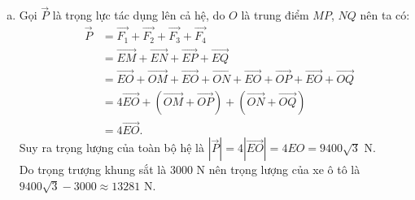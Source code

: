 \begin{ex}
{\begin{enumerate}[a)]
	 Xét $\triangle EMO$ có $EM=4700$, $\widehat{SMO}=60^\circ$. Suy ra $EO = EM \sin 60^\circ = 2350\sqrt{3}$.\\
	 Từ đây, ta tính được $\big|\vec{F_1}+\vec{F_3}\big|=2EO=8141$ N.
	\item Gọi $\vec{P}$ là trọng lực tác dụng lên cả hệ, do $O$ là trung điểm $MP$, $NQ$ nên ta có:
	 \begin{eqnarray*}
	 & \vec{P} & = \vec{F_1}+\vec{F_2}+\vec{F_3}+\vec{F_4}\\
	 & & = \vec{EM} + \vec{EN} + \vec{EP} + \vec{EQ}\\
	 & & = \vec{EO} + \vec{OM} + \vec{EO} + \vec{ON} + \vec{EO} + \vec{OP} + \vec{EO} + \vec{OQ}\\
	 & & = 4\vec{EO} + \left(\vec{OM} + \vec{OP}\right) + \left(\vec{ON} + \vec{OQ}\right)\\
	 & & = 4\vec{EO}.
	 \end{eqnarray*}
	 Suy ra trọng lượng của toàn bộ hệ là $\left| \vec{P} \right| = 4\left| \vec{EO}\right| = 4EO = 9400\sqrt{3}$ N.\\
	 Do trọng trượng khung sắt là $3000$ N nên trọng lượng của xe ô tô là $9400\sqrt{3} - 3000 \approx 13281$ N.
	\end{enumerate}
	}
\end{ex} 
